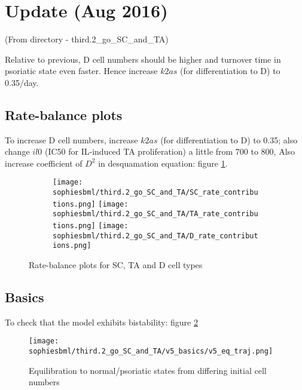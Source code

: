 \documentclass[a4paper,10pt]{report}
\newcommand{\psortbase}{/home/ngrs2/work/bsu/PSORT_Zuliani_Reynolds/}
\newcommand{\sbmlbase}{\psortbase/sbml-sh/}
\newcommand{\sophiesbml}{\sbmlbase/sophie_like}
\begin{document}
\section{Update (Aug 2016)} \label{sec:SWaug16}

(From directory  - third.2\_go\_SC\_and\_TA) 


Relative to previous, D cell numbers should be higher and turnover time in psoriatic state even faster. Hence increase $k2as$ (for differentiation to D) to 0.35/day.


\subsection{Rate-balance plots}

To increase D cell numbers, increase $k2as$ (for differentiation to D) to 0.35; also change $il0$ (IC50 for IL-induced TA proliferation) a little from 700 to 800, Also increase coefficient of $D^2$ in desquamation equation: figure   \ref{fig:thirdpointtworatebalance}.


\begin{figure}[h!]
  \begin{subfigure}{\textwidth}
    \texttt{[image: \\sophiesbml/third.2\_go\_SC\_and\_TA/SC\_rate\_contributions.png]}
    \texttt{[image: \\sophiesbml/third.2\_go\_SC\_and\_TA/TA\_rate\_contributions.png]}
    \texttt{[image: \\sophiesbml/third.2\_go\_SC\_and\_TA/D\_rate\_contributions.png]}
  \end{subfigure}
  \caption{Rate-balance plots for SC, TA and D cell types}
  \label{fig:thirdpointtworatebalance}
\end{figure}



\subsection{Basics}
To check that the model exhibits bistability: figure \ref{fig:thirdpointtwosophie_basics}

\begin{figure}[h!]
    \centering
    \texttt{[image: \\sophiesbml/third.2\_go\_SC\_and\_TA/v5\_basics/v5\_eq\_traj.png]}
  \caption{Equilibration to normal/psoriatic states from differing initial cell numbers}
  \label{fig:thirdpointtwosophie_basics}
\end{figure}
\end{document}

